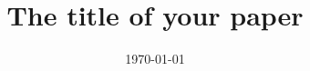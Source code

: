 \documentclass[aps,pra,twocolumn,superscriptaddress,amssymb,amsmath,floatfix,longbibliography,nofootinbib]{revtex4-2}
\begin{document}


\title{The title of your paper}


\date{\today}



\maketitle






\end{document}

